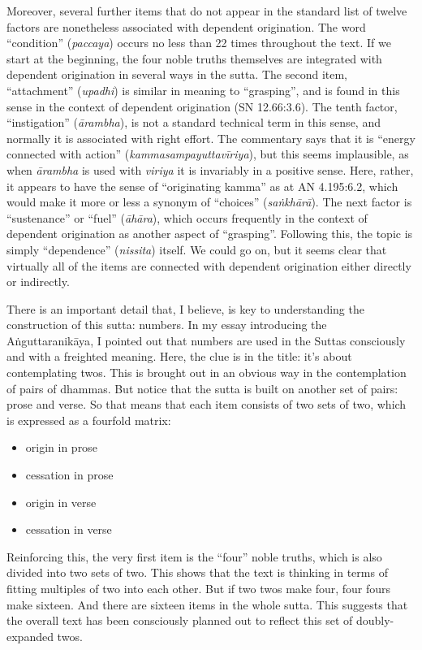 \documentclass[12pt,openany]{book}%
\begin{document}
Moreover, several further items that do not appear in the standard list of twelve factors are nonetheless associated with dependent origination. The word “condition” (\textit{paccaya}) occurs no less than 22 times throughout the text. If we start at the beginning, the four noble truths themselves are integrated with dependent origination in several ways in the sutta. The second item, “attachment” (\textit{upadhi}) is similar in meaning to “grasping”, and is found in this sense in the context of dependent origination (SN 12.66:3.6). The tenth factor, “instigation” (\textit{\textsanskrit{ārambha}}), is not a standard technical term in this sense, and normally it is associated with right effort. The commentary says that it is “energy connected with action” (\textit{\textsanskrit{kammasampayuttavīriya}}), but this seems implausible, as when \textit{\textsanskrit{ārambha}} is used with \textit{viriya} it is invariably in a positive sense. Here, rather, it appears to have the sense of “originating kamma” as at AN 4.195:6.2, which would make it more or less a synonym of “choices” (\textit{\textsanskrit{saṅkhārā}}). The next factor is “sustenance” or “fuel” (\textit{\textsanskrit{āhāra}}), which occurs frequently in the context of dependent origination as another aspect of “grasping”. Following this, the topic is simply “dependence” (\textit{nissita}) itself. We could go on, but it seems clear that virtually all of the items are connected with dependent origination either directly or indirectly.

There is an important detail that, I believe, is key to understanding the construction of this sutta: numbers. In my essay introducing the \textsanskrit{Aṅguttaranikāya}, I pointed out that numbers are used in the Suttas consciously and with a freighted meaning. Here, the clue is in the title: it’s about contemplating twos. This is brought out in an obvious way in the contemplation of pairs of dhammas. But notice that the sutta is built on another set of pairs: prose and verse. So that means that each item consists of two sets of two, which is expressed as a fourfold matrix:

\begin{itemize}%
\item origin in prose%
\item cessation in prose%
\item origin in verse%
\item cessation in verse%
\end{itemize}

Reinforcing this, the very first item is the “four” noble truths, which is also divided into two sets of two. This shows that the text is thinking in terms of fitting multiples of two into each other. But if two twos make four, four fours make sixteen. And there are sixteen items in the whole sutta. This suggests that the overall text has been consciously planned out to reflect this set of doubly-expanded twos.
\end{document}
